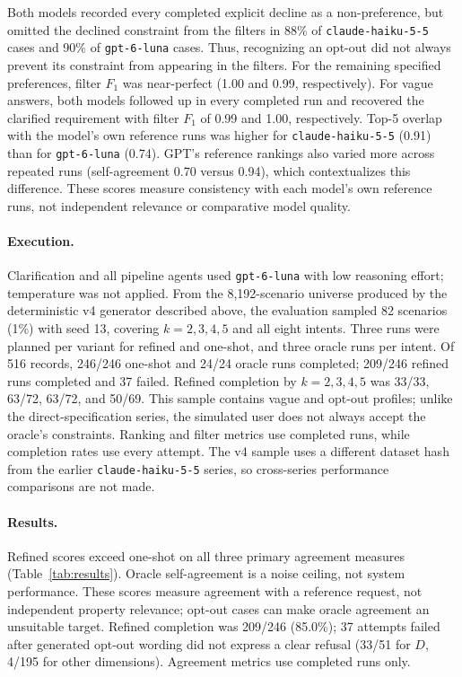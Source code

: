 \documentclass[sigconf,review]{acmart}
\begin{document}
Both models recorded every completed explicit decline as a non-preference,
but omitted the declined constraint from the filters in 88\% of
\texttt{claude-haiku-5-5} cases and 90\% of \texttt{gpt-6-luna} cases.
Thus, recognizing an opt-out did not always prevent its constraint from
appearing in the filters. For the remaining specified preferences,
filter $F_1$ was near-perfect (1.00 and 0.99, respectively). For vague
answers, both models followed up in every completed run and recovered the
clarified requirement with filter $F_1$ of 0.99 and 1.00, respectively.
Top-5 overlap with the model's own reference runs was higher for
\texttt{claude-haiku-5-5} (0.91) than for \texttt{gpt-6-luna} (0.74).
GPT's reference rankings also varied more across repeated runs
(self-agreement 0.70 versus 0.94), which contextualizes this difference.
These scores measure consistency with each model's own reference runs,
not independent relevance or comparative model quality.

\iffalse %
\paragraph{Execution.} Clarification and all pipeline agents used
\texttt{gpt-6-luna} with low reasoning effort; temperature was not
applied. From the
8,192-scenario universe produced by the deterministic v4 generator
described above, the evaluation sampled 82 scenarios (1\%) with seed 13,
covering $k=2,3,4,5$ and all eight intents. Three runs were planned per
variant for refined and one-shot, and three oracle runs per intent. Of 516
records, 246/246 one-shot and 24/24 oracle runs completed; 209/246 refined
runs completed and 37 failed. Refined completion by $k=2,3,4,5$ was
33/33, 63/72, 63/72, and 50/69. This sample contains vague and opt-out
profiles; unlike the direct-specification series, the simulated user does not always
accept the oracle's constraints. Ranking and filter metrics use completed
runs, while completion rates use every attempt. The v4 sample uses a
different dataset hash from the earlier \texttt{claude-haiku-5-5} series,
so cross-series
performance comparisons are not made.

\paragraph{Results.} Refined scores exceed one-shot on all three primary
agreement measures (Table~\ref{tab:results}). Oracle self-agreement is a
noise ceiling, not system
performance. These scores measure agreement with a reference request, not
independent property relevance; opt-out cases can make oracle agreement an
unsuitable target. Refined completion was 209/246 (85.0\%); 37 attempts
failed after generated opt-out wording did not express a clear refusal
(33/51 for $D$, 4/195 for other dimensions). Agreement metrics use completed
runs only.
\end{document}
